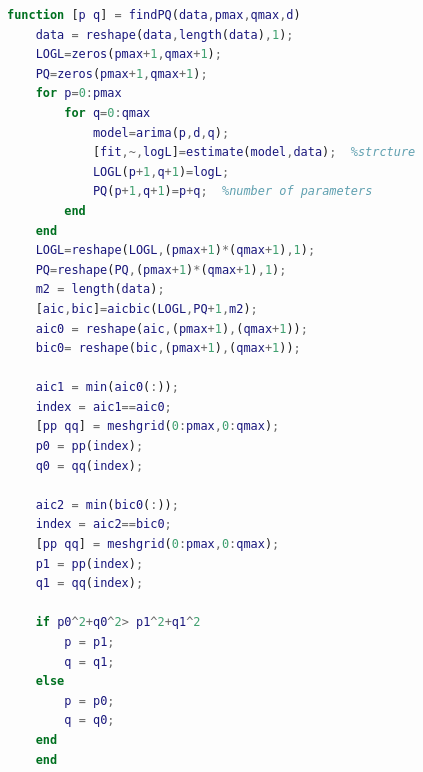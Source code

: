 \documentclass{apmcmthesis}
\begin{document}
\begin{lstlisting}[language=matlab,caption={The matlab source code of ARIMA}]
    function [p q] = findPQ(data,pmax,qmax,d)
    data = reshape(data,length(data),1);
    LOGL=zeros(pmax+1,qmax+1);
    PQ=zeros(pmax+1,qmax+1);
    for p=0:pmax
        for q=0:qmax
            model=arima(p,d,q);
            [fit,~,logL]=estimate(model,data);  %strcture
            LOGL(p+1,q+1)=logL;
            PQ(p+1,q+1)=p+q;  %number of parameters
        end
    end
    LOGL=reshape(LOGL,(pmax+1)*(qmax+1),1);
    PQ=reshape(PQ,(pmax+1)*(qmax+1),1);
    m2 = length(data);
    [aic,bic]=aicbic(LOGL,PQ+1,m2);
    aic0 = reshape(aic,(pmax+1),(qmax+1));
    bic0= reshape(bic,(pmax+1),(qmax+1));
    
    aic1 = min(aic0(:));
    index = aic1==aic0;
    [pp qq] = meshgrid(0:pmax,0:qmax);
    p0 = pp(index);
    q0 = qq(index);
    
    aic2 = min(bic0(:));
    index = aic2==bic0;
    [pp qq] = meshgrid(0:pmax,0:qmax);
    p1 = pp(index);
    q1 = qq(index);
    
    if p0^2+q0^2> p1^2+q1^2
        p = p1;
        q = q1;
    else
        p = p0;
        q = q0;
    end
    end
  \end{lstlisting}
  
\end{document}
